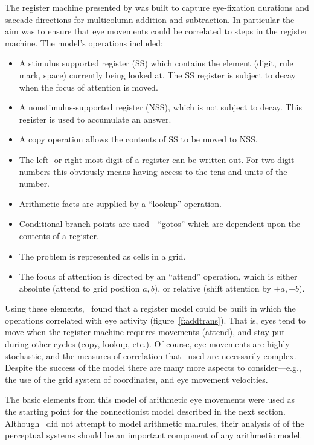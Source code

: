 The register machine presented by
 was built to capture
eye-fixation durations and saccade directions for multicolumn addition
and subtraction. In particular the aim was to ensure that eye movements
could be correlated to steps in the register machine. The model's
operations included:
\begin{itemize}
\item A stimulus supported register (SS) which contains the element
(digit, rule mark, space) currently being looked at. The SS register is
subject to decay when the focus of attention is moved.
\item A nonstimulus-supported register (NSS), which is not subject to
decay.  This register is used to accumulate an answer.
\item A copy operation allows the contents of SS to be moved to NSS.
\item The left- or right-most digit of a register can be written out.
For two digit numbers this obviously means having access
to the tens and units of the number.
\item Arithmetic facts are supplied by a ``lookup'' operation.
\item Conditional branch points are used---``gotos'' which are dependent
upon the contents of a register.
\item The problem is represented as cells in a grid.
\item The focus of attention is directed by an ``attend'' operation,
which is either absolute (attend to grid position $a,b$), or relative
(shift attention by $\pm a,\pm b$).
\end{itemize}

Using these elements, \citeauthor{suppproc}\ found that a register model
could be built in which the operations correlated with eye activity
(figure~\ref{f:addtrans}).
That is, eyes tend to move when the register machine requires movements
(attend), and stay put during other cycles (copy, lookup, etc.). Of course,
eye movements are highly stochastic, and the measures of correlation that
\citeauthor{suppproc}\
used are necessarily complex.  Despite the success of
the model there are many more aspects to consider---e.g., the
use of the grid system of coordinates, and eye movement velocities.

The basic elements from this model of arithmetic eye movements were used as
the starting point for the connectionist model described in the next
section. Although \citeauthor{suppproc}\
did not attempt to model arithmetic
malrules, their analysis of of the perceptual systems should be an
important component of any arithmetic model.


